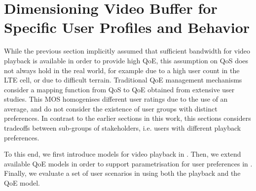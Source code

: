 \section{Dimensioning Video Buffer for Specific User Profiles and Behavior}\label{sec:application:qoe_user_behaviour}

\newcommand{\stallingRatio}{\ensuremath{R}\xspace}
\newcommand{\stallingDuration}{\ensuremath{L}\xspace}
\newcommand{\numberStallingEvents}{\ensuremath{N^*}\xspace}
\newcommand{\stallingFrequency}{\ensuremath{F}\xspace}
\newcommand{\meanStallingEventDuration}{\ensuremath{L}\xspace}

\newcommand{\networkBandwidth}{\ensuremath{\lambda}\xspace}
\newcommand{\playbackRate}{\ensuremath{\mu}\xspace}

\newcommand{\meanBusy}{\ensuremath{B}\xspace}
\newcommand{\meanIdle}{\ensuremath{L}\xspace}
\newcommand{\numberFrames}{\ensuremath{Z}\xspace}
\newcommand{\videoDownloadTime}{\ensuremath{t_Z}\xspace}

\newcommand{\watchLater}{\emph{Watch Later}\xspace}
\newcommand{\watchNow}{\emph{Watch Now}\xspace}
\newcommand{\videoBrowsing}{\emph{Video Browsing}\xspace}

While the previous section implicitly assumed that sufficient bandwidth for video playback is available in order to provide high \gls{QoE}, this assumption on \gls{QoS} does not always hold in the real world, for example due to a high user count in the \gls{LTE} cell, or due to difficult terrain.
Traditional \gls{QoE} management mechanisms~\cite{Hossfeld2013c} consider a mapping function from \gls{QoS} to \gls{QoE} obtained from extensive user studies.
This \gls{MOS} homogenises different user ratings due to the use of an average, and do not consider the existence of user groups with distinct preferences.
In contrast to the earlier sections in this work, this sections considers tradeoffs between sub-groups of stakeholders, i.e. users with different playback preferences.

To this end, we first introduce models for video playback in .
Then, we extend available \gls{QoE} models in order to support parametrisation for user preferences in .
Finally, we evaluate a set of user scenarios in  using both the playback and the \gls{QoE} model.



